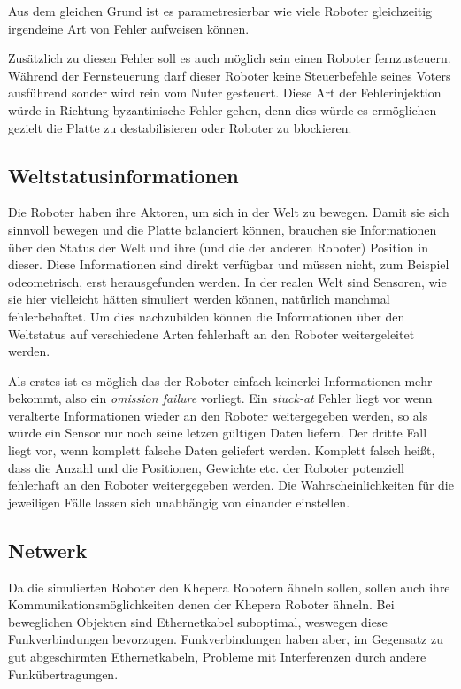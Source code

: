 Aus dem gleichen Grund ist es parametresierbar wie viele Roboter gleichzeitig irgendeine Art von Fehler aufweisen k{\"{o}}nnen.

Zus{\"{a}}tzlich zu diesen Fehler soll es auch m{\"{o}}glich sein einen Roboter fernzusteuern. W{\"{a}}hrend
der Fernsteuerung darf dieser Roboter keine Steuerbefehle seines Voters ausf{\"{u}}hrend sonder wird rein
vom Nuter gesteuert. Diese Art der Fehlerinjektion w{\"{u}}rde in Richtung byzantinische Fehler gehen,
denn dies w{\"{u}}rde es erm{\"{o}}glichen gezielt die Platte zu destabilisieren oder Roboter zu
blockieren.

\subsection{Weltstatusinformationen}
Die Roboter haben ihre Aktoren, um sich in der Welt zu bewegen. Damit sie sich sinnvoll bewegen und die Platte balanciert k{\"{o}}nnen, brauchen sie Informationen {\"{u}}ber den
Status der Welt und ihre (und die der anderen Roboter) Position in dieser. Diese Informationen sind direkt verf{\"{u}}gbar und m{\"{u}}ssen nicht, zum Beispiel odeometrisch,
erst herausgefunden werden. In der realen Welt sind Sensoren, wie sie hier vielleicht h{\"{a}}tten simuliert werden k{\"{o}}nnen, nat{\"{u}}rlich manchmal fehlerbehaftet.
Um dies nachzubilden k{\"{o}}nnen die Informationen {\"{u}}ber den Weltstatus auf verschiedene Arten fehlerhaft an den Roboter weitergeleitet werden.

Als erstes ist es m{\"{o}}glich das der Roboter einfach keinerlei Informationen mehr bekommt, also ein \textit{omission failure} vorliegt. Ein \textit{stuck-at} Fehler liegt
vor wenn veralterte Informationen wieder an den Roboter weitergegeben werden, so als w{\"{u}}rde ein Sensor nur noch seine letzen g{\"{u}}ltigen Daten liefern. Der dritte
Fall liegt vor, wenn komplett falsche Daten geliefert werden. Komplett falsch hei{\ss}t, dass die Anzahl und die Positionen, Gewichte etc. der Roboter potenziell fehlerhaft an
den Roboter weitergegeben werden. Die Wahrscheinlichkeiten f{\"{u}}r die jeweiligen F{\"{a}}lle lassen sich unabh{\"{a}}ngig von einander einstellen.

\subsection{Netwerk}
Da die simulierten Roboter den Khepera Robotern {\"{a}}hneln sollen, sollen auch ihre Kommunikationsm{\"{o}}glichkeiten denen der Khepera Roboter {\"{a}}hneln. Bei
beweglichen Objekten sind Ethernetkabel suboptimal, weswegen diese Funkverbindungen bevorzugen. Funkverbindungen haben aber, im Gegensatz zu gut abgeschirmten
Ethernetkabeln, Probleme mit Interferenzen durch andere Funk{\"{u}}bertragungen.

